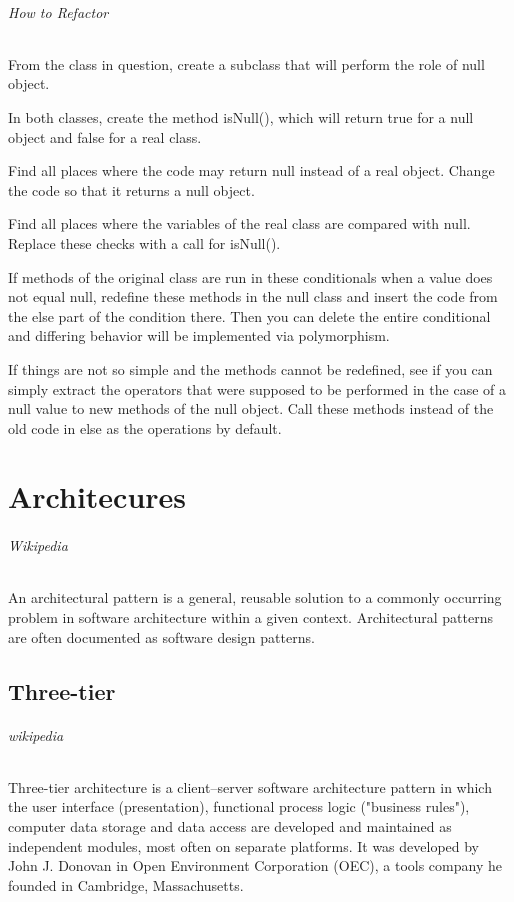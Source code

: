 \documentclass{book}
\newcounter{subpart}
\begin{document}
\paragraph{How to Refactor}

    From the class in question, create a subclass that will perform the role of null object.

    In both classes, create the method isNull(), which will return true for a null object and false for a real class.

    Find all places where the code may return null instead of a real object. Change the code so that it returns a null object.

    Find all places where the variables of the real class are compared with null. Replace these checks with a call for isNull().

    If methods of the original class are run in these conditionals when a value does not equal null, redefine these methods in the null class and insert the code from the else part of the condition there.
    Then you can delete the entire conditional and differing behavior will be implemented via polymorphism.

    If things are not so simple and the methods cannot be redefined,
    see if you can simply extract the operators that were supposed to be performed in the case of a null value to new methods of the null object.
    Call these methods instead of the old code in else as the operations by default.


\part{Architecures}

\paragraph{Wikipedia} An architectural pattern is a general, reusable solution to a commonly occurring problem in software architecture within a given context.
Architectural patterns are often documented as software design patterns.
\chapter{Three-tier}\label{ThreeTier}
\paragraph{wikipedia}
Three-tier architecture is a client–server software architecture pattern in which the user interface (presentation),
functional process logic ("business rules"), computer data storage and data access are developed and maintained as independent modules, most often on separate platforms.
It was developed by John J. Donovan in Open Environment Corporation (OEC), a tools company he founded in Cambridge, Massachusetts.
\end{document}
